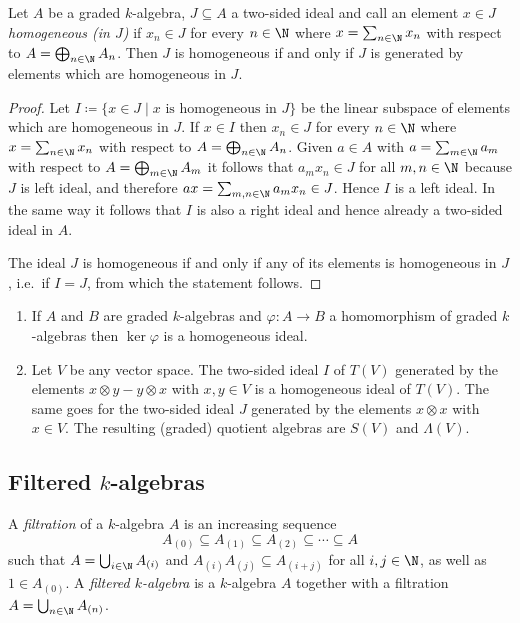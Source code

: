 \begin{lemma}
 Let $A$ be a graded $k$-algebra, $J \subseteq A$ a two-sided ideal and call an element $x \in J$ \emph{homogeneous (in $J$)} if $x_n \in J$ for every $n \in \N$ where $x = \sum_{n \in \N} x_n$ with respect to $A = \bigoplus_{n \in \N} A_n$. Then $J$ is homogeneous if and only if $J$ is generated by elements which are homogeneous in $J$.
\end{lemma}
\begin{proof}
 Let $I \coloneqq \{x \in J \mid \text{$x$ is homogeneous in $J$}\}$ be the linear subspace of elements which are homogeneous in $J$. If $x \in I$ then $x_n \in J$ for every $n \in \N$ where $x = \sum_{n \in \N} x_n$ with respect to $A = \bigoplus_{n \in \N} A_n$. Given $a \in A$ with $a = \sum_{m \in \N} a_m$ with respect to $A = \bigoplus_{m \in \N} A_m$ it follows that $a_m x_n \in J$ for all $m,n \in \N$ because $J$ is left ideal, and therefore $ax = \sum_{m,n \in \N} a_m x_n \in J$. Hence $I$ is a left ideal. In the same way it follows that $I$ is also a right ideal and hence already a two-sided ideal in $A$.
 
 The ideal $J$ is homogeneous if and only if any of its elements is homogeneous in $J$, i.e.\ if $I = J$, from which the statement follows.
\end{proof}


\begin{examples}
 \begin{enumerate}[leftmargin=*]
  \item
   If $A$ and $B$ are graded $k$-algebras and $\varphi \colon A \to B$ a homomorphism of graded $k$-algebras then $\ker \varphi$ is a homogeneous ideal.
  \item
   Let $V$ be any vector space. The two-sided ideal $I$ of $T(V)$ generated by the elements $x \otimes y - y \otimes x$ with $x,y \in V$ is a homogeneous ideal of $T(V)$. The same goes for the two-sided ideal $J$ generated by the elements $x \otimes x$ with $x \in V$. The resulting (graded) quotient algebras are $S(V)$ and $\Lambda(V)$.
 \end{enumerate}
\end{examples}



\subsection{Filtered $k$-algebras}


\begin{definition}
 A \emph{filtration} of a $k$-algebra $A$ is an increasing sequence
 \[
  A_{(0)}
  \subseteq A_{(1)}
  \subseteq A_{(2)}
  \subseteq \dotsb
  \subseteq A
 \]
 such that $A = \bigcup_{i \in \N} A_{(i)}$ and $A_{(i)} A_{(j)} \subseteq A_{(i+j)}$ for all $i,j \in \N$, as well as $1 \in A_{(0)}$. A \emph{filtered $k$-algebra} is a $k$-algebra $A$ together with a filtration $A = \bigcup_{n \in \N} A_{(n)}$.
\end{definition}


